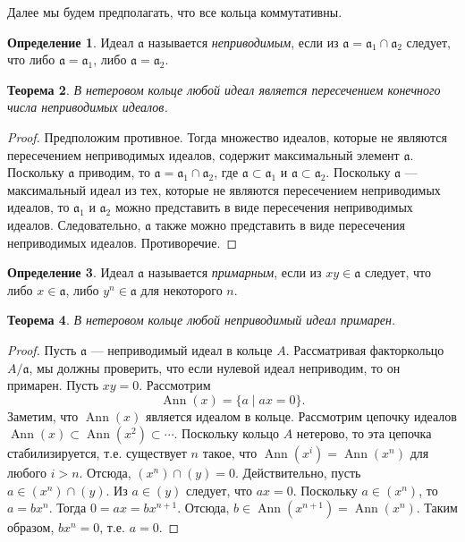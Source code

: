 \documentclass[12pt, titlepage, oneside]{amsbook}
\newcommand{\Ann}{\operatorname{Ann}}
\newcommand{\aaa}{\mathfrak{a}}
\newtheorem{theorem}{Теорема}[chapter]
\theoremstyle{definition}
\newtheorem{definition}[theorem]{Определение}
\theoremstyle{remark}
\begin{document}
Далее мы будем предполагать, что все кольца коммутативны.

\begin{definition}
	Идеал $\aaa$ называется \emph{неприводимым}, если из $\aaa=\aaa_1\cap\aaa_2$ следует, что либо $\aaa=\aaa_1$, либо $\aaa=\aaa_2$.
\end{definition}

\begin{theorem}
	\label{Net13}
	В нетеровом кольце любой идеал является пересечением конечного числа неприводимых идеалов.
\end{theorem}

\begin{proof}
	Предположим противное. Тогда множество идеалов, которые не являются пересечением неприводимых идеалов, содержит максимальный элемент $\aaa$. Поскольку $\aaa$ приводим, то $\aaa=\aaa_1\cap\aaa_2$, где $\aaa\subset\aaa_1$ и $\aaa\subset\aaa_2$. Поскольку $\aaa$ --- максимальный идеал из тех, которые не являются пересечением неприводимых идеалов, то $\aaa_1$ и $\aaa_2$ можно представить в виде пересечения неприводимых идеалов. Следовательно, $\aaa$ также можно представить в виде пересечения неприводимых идеалов. Противоречие.
\end{proof}

\begin{definition}
	Идеал $\aaa$ называется \emph{примарным}, если из $xy\in\aaa$ следует, что либо $x\in\aaa$, либо $y^n\in\aaa$ для некоторого $n$.
\end{definition}

\begin{theorem}
	\label{Net14}
	В нетеровом кольце любой неприводимый идеал примарен.
\end{theorem}

\begin{proof}
	Пусть $\aaa$ --- неприводимый идеал в кольце $A$. Рассматривая факторкольцо $A/\aaa$, мы должны проверить, что если нулевой идеал неприводим, то он примарен. Пусть $xy=0$. Рассмотрим $$\Ann(x)=\{a\mid ax=0\}.$$ Заметим, что $\Ann(x)$ является идеалом в кольце. Рассмотрим цепочку идеалов $\Ann(x)\subset\Ann(x^2)\subset\cdots$. Поскольку кольцо $A$ нетерово, то эта цепочка стабилизируется, т.е. существует $n$ такое, что $\Ann(x^i)=\Ann(x^n)$ для любого $i>n$. Отсюда, $(x^n)\cap(y)=0$. Действительно, пусть $a\in(x^n)\cap(y)$. Из $a\in(y)$ следует, что $ax=0$. Поскольку $a\in(x^n)$, то $a=bx^n$. Тогда $0=ax=bx^{n+1}$. Отсюда, $b\in\Ann(x^{n+1})=\Ann(x^{n})$. Таким образом, $bx^n=0$, т.е. $a=0$.
\end{proof}
\end{document}
